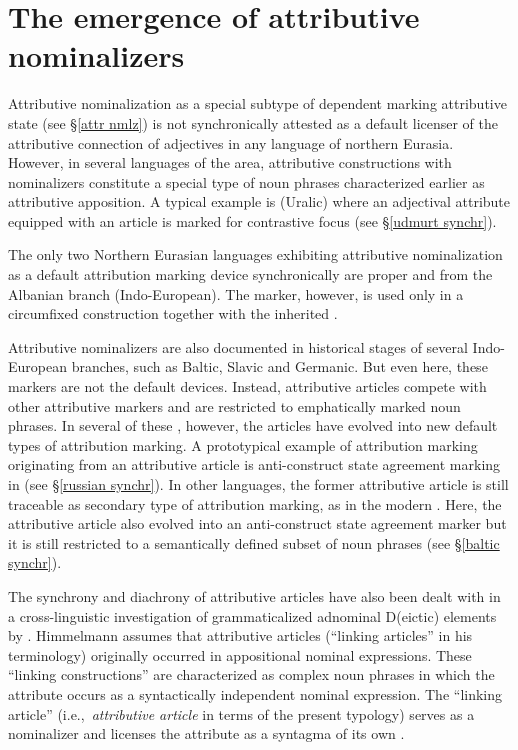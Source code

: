 \section[Attributive nominalizers]{The emergence of attributive nominalizers}
Attributive nominalization as a special subtype of dependent marking attributive state (see \S\ref{attr nmlz}) is not synchronically attested as a default licenser of the attributive connection of adjectives in any language of northern Eurasia. However, in several languages of the area, attributive constructions with nominalizers constitute a special type of noun phrases characterized earlier as attributive apposition. A typical example is  (Uralic) where an adjectival attribute equipped with an article is marked for contrastive focus (see \S\ref{udmurt synchr}).

The only two Northern Eurasian languages exhibiting attributive nominalization as a default attribution marking device synchronically are  proper and  from the Albanian branch (Indo-European). The marker, however, is used only in a circumfixed construction together with the inherited .

Attributive nominalizers are also documented in historical stages of several Indo-European branches, such as Baltic, Slavic and Germanic. But even here, these markers are not the default devices. Instead, attributive articles compete with other attributive markers and are restricted to emphatically marked noun phrases. In several of these , however, the articles have evolved into new default types of attribution marking. A prototypical example of attribution marking originating from an attributive article is anti\hyp{}construct state agreement marking in  (see \S\ref{russian synchr}). In other languages, the former attributive article is still traceable as secondary type of attribution marking, as in the modern . Here, the attributive article also evolved into an anti\hyp{}construct state agreement marker but it is still restricted to a semantically defined subset of noun phrases (see \S\ref{baltic synchr}). 

The synchrony and diachrony of attributive articles have also been dealt with in a cross-linguistic investigation of grammaticalized adnominal D(eictic) elements by \cite{himmelmann1997}. Himmelmann assumes that attributive articles (“linking articles” in his terminology) originally occurred in appositional nominal expressions. These “linking constructions” are characterized as complex noun phrases in which the attribute occurs as a syntactically independent nominal expression. The “linking article” (i.e.,~\textit{attributive article} in terms of the present typology) serves as a nominalizer and licenses the attribute as a syntagma of its own \cite[188]{himmelmann1997}.

